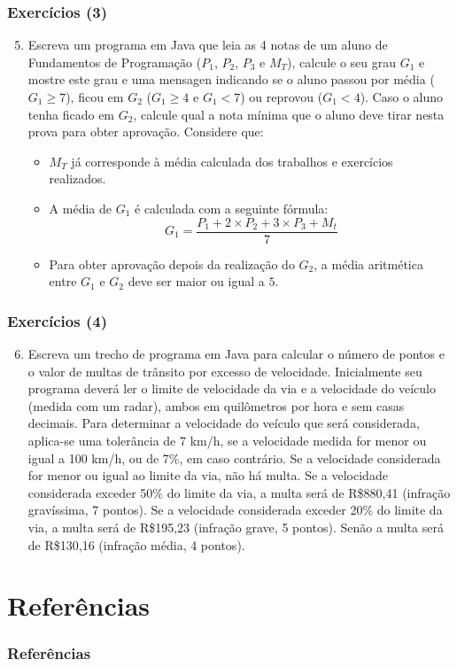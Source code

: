 \documentclass[xcolor={dvipsnames,table},aspectratio=169]{beamer}
\begin{document}
\begin{frame}\frametitle{Exercícios (3)}
\begin{enumerate}
	\setcounter{enumi}{4}
	\item Escreva um programa em Java que leia as 4 notas de um aluno de Fundamentos de Programação ($P_1$, $P_2$, $P_3$ e $M_T$), calcule o seu grau $G_1$ e mostre este grau e uma mensagen indicando se o aluno passou por média ($G_1 \ge 7$), ficou em $G_2$ ($G_1 \ge 4$ e $G_1 < 7$) ou reprovou ($G_1 < 4$). Caso o aluno tenha ficado em $G_2$, calcule qual a nota mínima que o aluno deve tirar nesta prova para obter aprovação.
	Considere que:
	\begin{itemize}
		\item $M_T$ já corresponde à média calculada dos trabalhos e exercícios realizados.
		\item A média de $G_1$ é calculada com a seguinte fórmula:
\[ G_1 = \frac{P_1 + 2 \times P_2 + 3 \times P_3 + M_t}{7} \]
		\item Para obter aprovação depois da realização do $G_2$, a média aritmética entre $G_1$ e $G_2$ deve ser maior ou igual a $5$.
	\end{itemize}
\end{enumerate}
\end{frame}

\begin{frame}\frametitle{Exercícios (4)}
\begin{enumerate}
	\setcounter{enumi}{5}
	\item Escreva um trecho de programa em Java para calcular o número de pontos e o valor de multas de trânsito por excesso de velocidade. Inicialmente seu programa deverá ler o limite de velocidade da via e a velocidade do veículo (medida com um radar), ambos em quilômetros por hora e sem casas decimais. Para determinar a velocidade do veículo que será considerada, aplica-se uma tolerância de 7 km/h, se a velocidade medida for menor ou igual a 100 km/h, ou de 7\%, em caso contrário. Se a velocidade considerada for menor ou igual ao limite da via, não há multa. Se a velocidade considerada exceder 50\% do limite da via, a multa será de R\$880,41 (infração gravíssima, 7 pontos). Se a velocidade considerada exceder 20\% do limite da via, a multa será de R\$195,23 (infração grave, 5 pontos). Senão a multa será de R\$130,16 (infração média, 4 pontos).
\end{enumerate}
\end{frame}

\section{Referências}

\begin{frame}\frametitle{Referências}
\end{frame}

\end{document}
